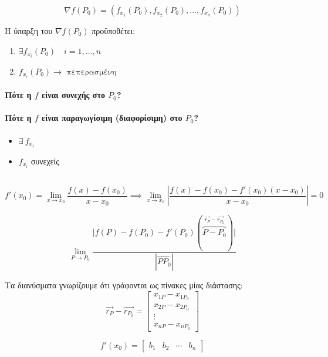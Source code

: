 \documentclass[11pt,a4paper,titlepage]{article}
\begin{document}
\subsubsection{}
\[
\nabla f(P_0) =
\left(
f_{x_1}(P_0),f_{x_2}(P_0),\dots,f_{x_n}(P_0)
\right)
\]

Η ύπαρξη του \(\nabla f(P_0)\) προϋποθέτει:
\begin{enumerate}
\item \(\exists f_{x_i}(P_0)\quad i=1,\dots,n\)
\item \(f_{x_i}(P_0) \rightarrow \text{ πεπερασμένη}\)
\end{enumerate}

\paragraph{Πότε η \(f\) είναι συνεχής στο \(P_0\)?}

\paragraph{Πότε η \(f\) είναι παραγωγίσιμη (διαφορίσιμη) στο \(P_0\)?}
\begin{itemize}
\item \(\exists \ f_{x_i}\)
\item \(f_{x_i}\) συνεχείς
\end{itemize}

\subsection{}
\[
f'(x_0) = \lim_{x\to x_0}\frac{f(x)-f(x_0)}{x-x_0}
\implies
\lim_{x\to x_0} \left|
\frac{f(x)-f(x_0)-f'(x_0)(x-x_0)}{x-x_0}
\right| = 0
\]

\[
\lim_{P\to P_0}
\frac{
\Big|
f(P)-f(P_0)-f'(P_0)(\overbrace{P-P_0}^{\vec{r_P}-\vec{r_{P_0}}})
\Big|
}{|\overrightarrow{PP_0}|}
\]

Τα διανύσματα γνωρίζουμε ότι γράφονται ως πίνακες μίας διάστασης:
\[
\vec{r_P}-\vec{r_{P_0}} =
\begin{bmatrix}
x_{1P}-x_{1P_0}\\
x_{2P}-x_{2P_0}\\
\vdots\\
x_{nP}-x_{nP_0}
\end{bmatrix}
\]

\[
f'(x_0)=\begin{bmatrix}
b_1&b_2&\cdots&b_n
\end{bmatrix}
\]
\end{document}
